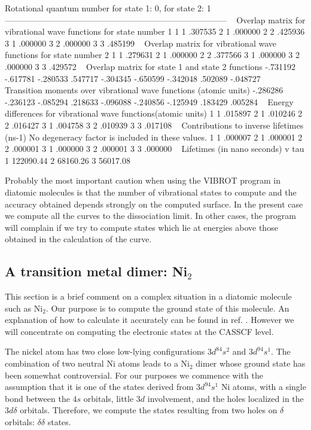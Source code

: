 \begin{sourcelisting}
 Rotational quantum number for state 1:  0, for state 2:  1
 --------------------------------------------------------------------------------
~
 Overlap matrix for vibrational wave functions for state number  1
 1  1  .307535  2  1  .000000  2  2  .425936  3  1  .000000  3  2  .000000  3  3  .485199
~
 Overlap matrix for vibrational wave functions for state number  2
 1  1  .279631  2  1  .000000  2  2  .377566  3  1  .000000  3  2  .000000  3  3  .429572
~
 Overlap matrix for state 1 and state 2 functions
   -.731192  -.617781  -.280533
    .547717  -.304345  -.650599
   -.342048   .502089  -.048727
~
 Transition moments over vibrational wave functions (atomic units)
   -.286286  -.236123  -.085294
    .218633  -.096088  -.240856
   -.125949   .183429   .005284
~
 Energy differences for vibrational wave functions(atomic units)
 1  1  .015897  2  1  .010246  2  2  .016427  3  1  .004758  3  2  .010939  3  3  .017108
~
 Contributions to inverse lifetimes (ns-1)
No degeneracy factor is included in these values.
 1  1  .000007  2  1  .000001  2  2  .000001  3  1  .000000  3  2 .000001   3  3  .000000
~
 Lifetimes (in nano seconds)
   v       tau
   1 122090.44
   2  68160.26
   3  56017.08
\end{sourcelisting}

Probably the most important caution when using the VIBROT program
in diatomic molecules is that the number of vibrational
states to compute and the accuracy obtained depends
strongly on the computed surface. In the present case we
compute all the curves to the dissociation limit. In other cases, the program
will complain if we try to compute states which lie at energies
above those obtained in the calculation of the curve.

\subsection{A transition metal dimer: Ni$_2$}
\label{TUT:sec:ni2}

This section is a brief comment on a complex situation in a diatomic
molecule such as Ni$_2$. Our purpose is to compute the ground state
of this molecule. An explanation of how to calculate it accurately can
be found in ref. \cite{Pou:94}. However we will concentrate on computing
the electronic states at the CASSCF level.

The nickel atom has two close low-lying configurations $3d^84s^2$ and
$3d^94s^1$. The combination of two neutral Ni atoms leads to a
Ni$_2$ dimer whose ground state has been somewhat controversial.
For our purposes we commence with the assumption that it is 
one of the states derived
from $3d^94s^1$ Ni atoms, with a single bond between the $4s$ orbitals,
little $3d$ involvement, and the holes localized in the $3d\delta$ orbitals.
Therefore, we compute the states resulting from two
holes on $\delta$ orbitals: $\delta\delta$ states. 


